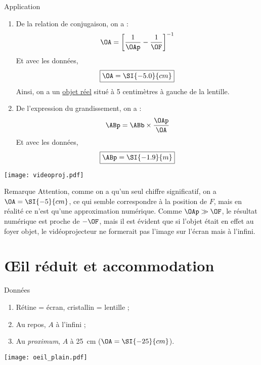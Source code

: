 \documentclass[a4paper, 12pt, final, garamond]{book}
\begin{document}
\begin{NCexem}{Application}
    \begin{enumerate}
        \item De la relation de conjugaison, on a :
            \[\OA = \left[ \frac{1}{\OAp} - \frac{1}{\OF} \right]^{-1}\]
            Et avec les données,
            \[ \boxed{\OA = \SI{- 5.0}{cm}}\]
            Ainsi, on a un \underline{objet réel} situé à 5 centimètres à gauche de
            la lentille.

        \item De l'expression du grandissement, on a :
            \[\ABp = \ABb\times\frac{\OAp}{\OA}\]
            Et avec les données,
            \[ \boxed{\ABp = \SI{- 1.9}{m}} \]
    \end{enumerate}
    \tcblower
    \begin{center}
        \texttt{[image: videoproj.pdf]}
    \end{center}

\end{NCexem}

\begin{NCrema}{Remarque}
    Attention, comme on a qu'un seul chiffre significatif, on a $\OA =
    \SI{-5}{cm}$, ce qui semble correspondre à la position de $F$, mais en
    réalité ce n'est qu'une approximation numérique. Comme $\OAp \gg \OF$, le
    résultat numérique est proche de $-\OF$, mais il est évident que si l'objet
    était en effet au foyer objet, le vidéoprojecteur ne formerait pas l'image
    sur l'écran mais à l'infini.
\end{NCrema}

\section{Œil réduit et accommodation}
\begin{NCdefi}{Données}
    \begin{minipage}{0.5\linewidth}
        \begin{enumerate}
            \item Rétine = écran, \smallbreak
                cristallin = lentille ;
            \item Au repos, $A$ à l'infini ;
            \item Au \textit{proximum}, $A$ à \SI{25}{cm} \smallbreak
                ($\OA = \SI{-25}{cm}$).
        \end{enumerate}
    \end{minipage}
    \begin{minipage}{0.5\linewidth}
        \begin{center}
            \texttt{[image: oeil\_plain.pdf]}
        \end{center}
    \end{minipage}
\end{NCdefi}
\end{document}
